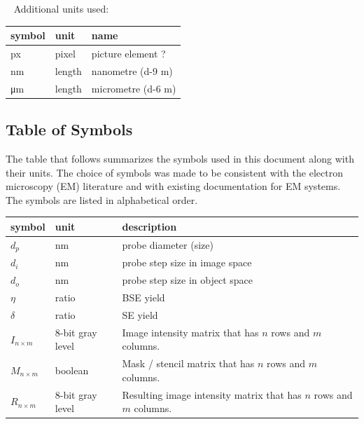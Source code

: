 \documentclass[12pt]{article}
\begin{document}
~\newline
Additional units used:
~\newline

  \noindent \begin{tabular}{l l l} 
    \toprule		
    \textbf{symbol} & \textbf{unit} & \textbf{name}\\
    \midrule
    px & pixel & picture element ?\\
    \si{\nm} & length & nanometre (\num{d-9} m)\\
    \si{\um} & length & micrometre (\num{d-6} m)\\
    \bottomrule
  \end{tabular}

\subsection{Table of Symbols}

The table that follows summarizes the symbols used in this document along with
their units.  The choice of symbols was made to be consistent with the electron
microscopy (EM) literature and with existing documentation for EM systems. 
The symbols are listed in alphabetical order.

\renewcommand{\arraystretch}{1.2}
\noindent \begin{longtable*}{l l p{12cm}} \toprule
\textbf{symbol} & \textbf{unit} & \textbf{description}\\
\midrule 
$d_p$ & \si[per-mode=symbol] {\nm} & probe diameter (size)\\
$d_i$ & \si[per-mode=symbol] {\nm} & probe step size in image space\\
$d_o$ & \si[per-mode=symbol] {\nm} & probe step size in object space\\
$\eta$ & ratio & BSE yield \\
$\delta$ & ratio & SE yield \\
$I_{n\times m}$ & 8-bit gray level & Image intensity matrix that has $n$ rows and $m$ columns.\\
$M_{n\times m}$ & boolean & Mask / stencil matrix that has $n$ rows and $m$ columns.\\
$R_{n\times m}$ & 8-bit gray level & Resulting image intensity matrix that has $n$ rows and $m$ columns.\\
\bottomrule
\end{longtable*}
\end{document}

